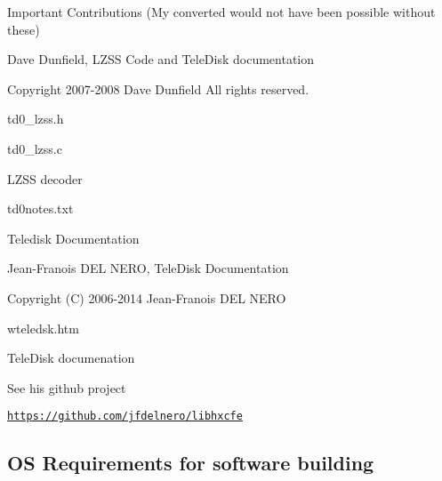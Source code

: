 \begin{DoxyItemize}
\item Important Contributions (My converted would not have been possible without these)
\begin{DoxyItemize}
\item Dave Dunfield, L\+Z\+SS Code and Tele\+Disk documentation
\begin{DoxyItemize}
\item Copyright 2007-\/2008 Dave Dunfield All rights reserved.
\item td0\+\_\+lzss.\+h
\item td0\+\_\+lzss.\+c
\begin{DoxyItemize}
\item L\+Z\+SS decoder
\end{DoxyItemize}
\item td0notes.\+txt
\begin{DoxyItemize}
\item Teledisk Documentation
\end{DoxyItemize}
\end{DoxyItemize}
\item Jean-\/\+Franois D\+EL N\+E\+RO, Tele\+Disk Documentation
\begin{DoxyItemize}
\item Copyright (C) 2006-\/2014 Jean-\/\+Franois D\+EL N\+E\+RO
\begin{DoxyItemize}
\item wteledsk.\+htm
\begin{DoxyItemize}
\item Tele\+Disk documenation
\end{DoxyItemize}
\item See his github project
\begin{DoxyItemize}
\item \href{https://github.com/jfdelnero/libhxcfe}{\tt https\+://github.\+com/jfdelnero/libhxcfe} 


\end{DoxyItemize}
\end{DoxyItemize}
\end{DoxyItemize}
\end{DoxyItemize}
\end{DoxyItemize}

\subsection*{OS Requirements for software building}


